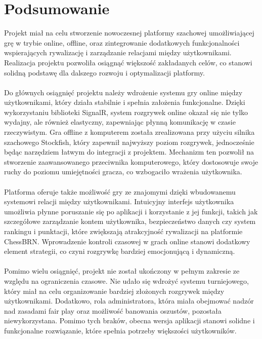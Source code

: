 \documentclass[12pt,a4paper]{article}
\begin{document}
\section{Podsumowanie}

\noindent
Projekt miał na celu stworzenie nowoczesnej platformy szachowej umożliwiającej grę w trybie online, offline, oraz zintegrowanie dodatkowych funkcjonalności wspierających rywalizację i zarządzanie relacjami między użytkownikami. Realizacja projektu pozwoliła osiągnąć większość zakładanych celów, co stanowi solidną podstawę dla dalszego rozwoju i optymalizacji platformy.
\\\\
Do głównych osiągnięć projektu należy wdrożenie systemu gry online między użytkownikami, który działa stabilnie i spełnia założenia funkcjonalne. Dzięki wykorzystaniu biblioteki SignalR, system rozgrywek online okazał się nie tylko wydajny, ale również elastyczny, zapewniając płynną komunikację w czasie rzeczywistym. Gra offline z komputerem została zrealizowana przy użyciu silnika szachowego Stockfish, który zapewnił najwyższy poziom rozgrywek, jednocześnie będąc narzędziem łatwym do integracji z projektem. Mechanizm ten pozwolił na stworzenie zaawansowanego przeciwnika komputerowego, który dostosowuje swoje ruchy do poziomu umiejętności gracza, co wzbogaciło wrażenia użytkownika.
\\\\
Platforma oferuje także możliwość gry ze znajomymi dzięki wbudowanemu systemowi relacji między użytkownikami. Intuicyjny interfejs użytkownika umożliwia płynne poruszanie się po aplikacji i korzystanie z jej funkcji, takich jak szczegółowe zarządzanie kontem użytkownika, bezpieczeństwo danych czy system rankingu i punktacji, które zwiększają atrakcyjność rywalizacji na platformie ChessBRN. Wprowadzenie kontroli czasowej w grach online stanowi dodatkowy element strategii, co czyni rozgrywkę bardziej emocjonującą i dynamiczną.
\\\\
Pomimo wielu osiągnięć, projekt nie został ukończony w pełnym zakresie ze względu na ograniczenia czasowe. Nie udało się wdrożyć systemu turniejowego, który miał na celu organizowanie bardziej złożonych rozgrywek między użytkownikami. Dodatkowo, rola administratora, która miała obejmować nadzór nad zasadami fair play oraz możliwość banowania oszustów, pozostała niewykorzystana. Pomimo tych braków, obecna wersja aplikacji stanowi solidne i funkcjonalne rozwiązanie, które spełnia potrzeby większości użytkowników.
\end{document}
